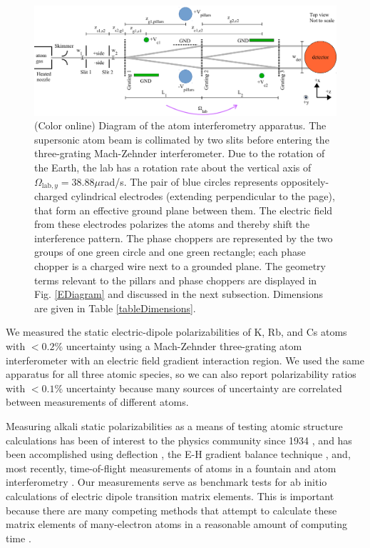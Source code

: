 \documentclass[twocolumn,prl,showpacs,superscriptaddress]{revtex4-1}   %
\newcommand{\figref}[1]{Fig. \ref{#1}}
\newcommand{\Omegalab}{\Omega_{\mathrm{lab},y}}
\begin{document}
\begin{figure}
\includegraphics[width=\linewidth,keepaspectratio]{IFM_diagram1.pdf}
\caption{\label{IFMDiagram}(Color online) Diagram of the atom interferometry apparatus. The supersonic atom beam is collimated by two slits before entering the three-grating Mach-Zehnder interferometer. Due to the rotation of the Earth, the lab has a rotation rate about the vertical axis of $\Omegalab = 38.88\mu$rad/s. 
The pair of blue circles represents oppositely-charged cylindrical electrodes (extending perpendicular to the page), that form an effective ground plane between them. The electric field from these electrodes polarizes the atoms and thereby shift the interference pattern. 
The phase choppers are represented by the two groups of one green circle and one green rectangle; each phase chopper is a charged wire next to a grounded plane. The geometry terms relevant to the pillars and phase choppers are displayed in \figref{EDiagram} and discussed in the next subsection. Dimensions are given in Table \ref{tableDimensions}.}
\end{figure}

We measured the static electric-dipole polarizabilities of K, Rb, and Cs atoms with $<0.2\%$ uncertainty using a Mach-Zehnder three-grating atom interferometer \cite{Berman1997,Cronin2009} with an electric field gradient interaction region. We used the same apparatus for all three atomic species, so we can also report polarizability ratios with $<0.1\%$ uncertainty because many sources of uncertainty are correlated between measurements of different atoms. 

Measuring alkali static polarizabilities as a means of testing atomic 
structure calculations has been of interest to the physics community since
1934 \cite{Scheffers1934}, and has been
accomplished using deflection \cite{Scheffers1934,Chamberlain1963,Hall1974}, the E-H gradient
balance technique \cite{Salop1961,Molof1974}, and, most recently, time-of-flight measurements of atoms in a fountain \cite{Amini2003} and atom interferometry 
\cite{Ekstrom1995,Miffre2006,Holmgren2010}.
Our measurements serve as benchmark tests for ab initio calculations of electric dipole transition matrix elements. This is important because there are many competing methods that attempt to calculate these matrix elements of many-electron atoms in a reasonable amount of computing time \cite{Mitroy2010}. 
\end{document}
